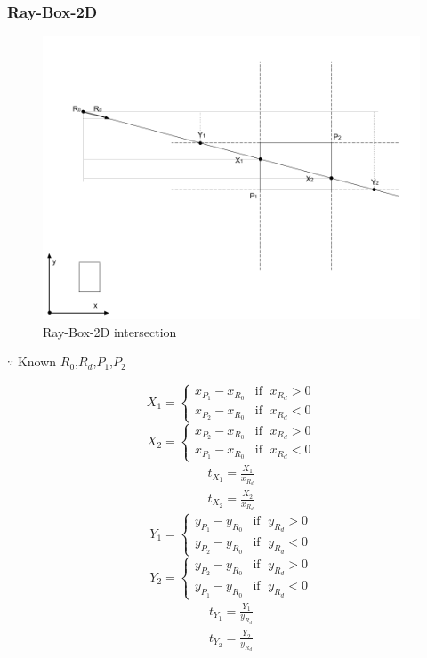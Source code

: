 \subsubsection{Ray-Box-2D}

\begin{figure}[H]
\caption[ray-box-2d-intersection]{Ray-Box-2D intersection}
\label{fig:ray-box-2d}
\centering
\includegraphics[width=\linewidth]{Figures/ray-box-2d-intersection.png}
\decoRule
\end{figure}

$\because$ Known $R_0$,\enspace$R_d$,\enspace$P_1$,\enspace$P_2$
\begin{multicols}{2}
\noindent
\[
X_1 =
\begin{cases}
x_{P_1} - x_{R_0} & \text{if }\;x_{R_d} > 0 \\
x_{P_2} - x_{R_0} & \text{if }\;x_{R_d} < 0
\end{cases}
\]
\[
X_2 =
\begin{cases}
x_{P_2} - x_{R_0} & \text{if }\;x_{R_d} > 0 \\
x_{P_1} - x_{R_0} & \text{if }\;x_{R_d} < 0
\end{cases}
\]
\[
\begin{array}{lr}
t_{X_1} = \frac{X_1}{x_{R_d}} \\
t_{X_2} = \frac{X_2}{x_{R_d}}
\end{array}
\]
\columnbreak
\[
Y_1 =
\begin{cases}
y_{P_1} - y_{R_0} & \text{if }\;y_{R_d} > 0 \\
y_{P_2} - y_{R_0} & \text{if }\;y_{R_d} < 0
\end{cases}
\]
\[
Y_2 =
\begin{cases}
y_{P_2} - y_{R_0} & \text{if }\;y_{R_d} > 0 \\
y_{P_1} - y_{R_0} & \text{if }\;y_{R_d} < 0
\end{cases}
\]
\[
\begin{array}{lr}
t_{Y_1} = \frac{Y_1}{y_{R_d}} \\
t_{Y_2} = \frac{Y_2}{y_{R_d}}
\end{array}
\]
\end{multicols}

